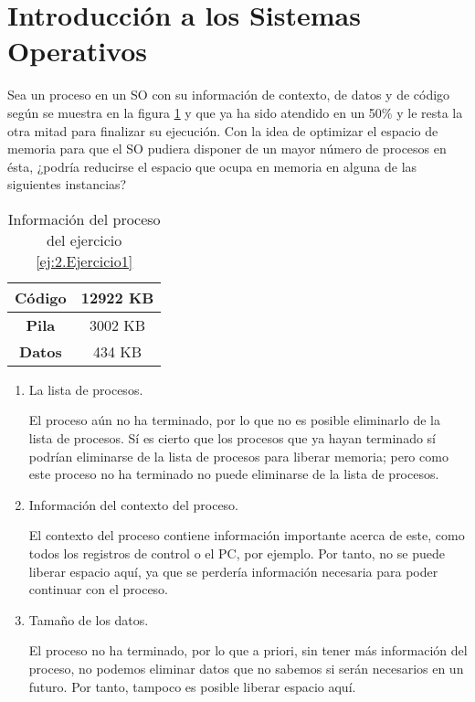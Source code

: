 \section{Introducción a los Sistemas Operativos}

\begin{ejercicio}\label{ej:2.Ejercicio1}
    Sea un proceso en un SO con su información de contexto, de datos y de código según se muestra en la figura \ref{tab:Ej1} y que ya ha sido atendido en un 50\% y le resta la otra mitad para finalizar su ejecución. Con la idea de optimizar el espacio de memoria para que el SO pudiera disponer de un mayor número de procesos en ésta, ¿podría reducirse el espacio que ocupa en memoria en alguna de las siguientes instancias?
    \begin{table}[H]
        \centering
        \begin{tabular}{|c|c|}
            \hline
            \textbf{Código}& 12922 KB \\\hline
            \textbf{Pila}& 3002 KB \\\hline
            \textbf{Datos}& 434 KB \\ \hline
        \end{tabular}
        \caption{Información del proceso del ejercicio \ref{ej:2.Ejercicio1}}
        \label{tab:Ej1}
    \end{table}
    
    \begin{enumerate}[label=(\alph*)]
      \item La lista de procesos.

      El proceso aún no ha terminado, por lo que no es posible eliminarlo de la lista de procesos. Sí es cierto que los procesos que ya hayan terminado sí podrían eliminarse de la lista de procesos para liberar memoria; pero como este proceso no ha terminado no puede eliminarse de la lista de procesos.
      
      \item Información del contexto del proceso.

      El contexto del proceso contiene información importante acerca de este, como todos los registros de control o el PC, por ejemplo. Por tanto, no se puede liberar espacio aquí, ya que se perdería información necesaria para poder continuar con el proceso.
      
      \item Tamaño de los datos.

      El proceso no ha terminado, por lo que a priori, sin tener más información del proceso, no podemos eliminar datos que no sabemos si serán necesarios en un futuro. Por tanto, tampoco es posible liberar espacio aquí.
      

\end{enumerate}
\end{ejercicio}
